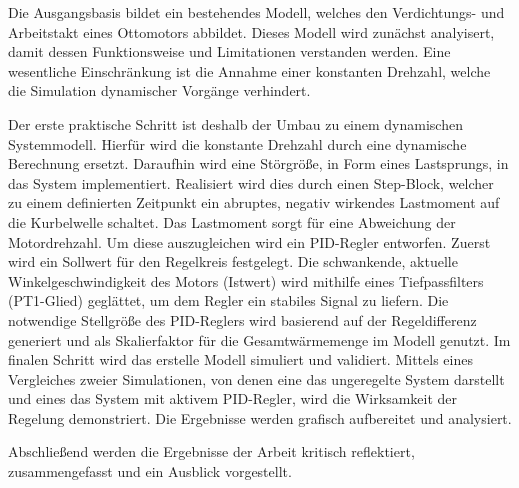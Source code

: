 Die Ausgangsbasis bildet ein bestehendes Modell, welches den Verdichtungs- und Arbeitstakt eines Ottomotors abbildet.
Dieses Modell wird zunächst analyisert, damit dessen Funktionsweise und Limitationen verstanden werden.
Eine wesentliche Einschränkung ist die Annahme einer konstanten Drehzahl, welche die Simulation dynamischer Vorgänge verhindert.

Der erste praktische Schritt ist deshalb der Umbau zu einem dynamischen Systemmodell.
Hierfür wird die konstante Drehzahl durch eine dynamische Berechnung ersetzt.
Daraufhin wird eine Störgröße, in Form eines Lastsprungs, in das System implementiert.
Realisiert wird dies durch einen Step-Block, welcher zu einem definierten Zeitpunkt ein abruptes, negativ wirkendes Lastmoment auf die Kurbelwelle schaltet.
Das Lastmoment sorgt für eine Abweichung der Motordrehzahl.
Um diese auszugleichen wird ein PID-Regler entworfen.
Zuerst wird ein Sollwert für den Regelkreis festgelegt.
Die schwankende, aktuelle Winkelgeschwindigkeit des Motors (Istwert) wird mithilfe eines Tiefpassfilters (PT1-Glied) geglättet, um dem Regler ein stabiles Signal zu liefern.
Die notwendige Stellgröße des PID-Reglers wird basierend auf der Regeldifferenz generiert und als Skalierfaktor für die Gesamtwärmemenge im Modell genutzt.
Im finalen Schritt wird das erstelle Modell simuliert und validiert.
Mittels eines Vergleiches zweier Simulationen, von denen eine das ungeregelte System darstellt und eines das System mit aktivem PID-Regler, wird die Wirksamkeit der Regelung demonstriert.
Die Ergebnisse werden grafisch aufbereitet und analysiert.

Abschließend werden die Ergebnisse der Arbeit kritisch reflektiert, zusammengefasst und ein Ausblick vorgestellt.
